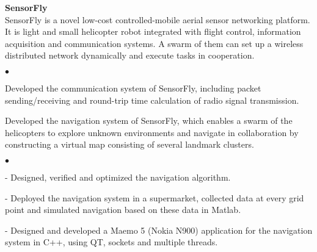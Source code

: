\documentclass[margin,line]{res}
\newenvironment{list1}{
  \begin{list}{\ding{113}}{
      \setlength{\itemsep}{0in}
      \setlength{\parsep}{0in} \setlength{\parskip}{0in}
      \setlength{\topsep}{0in} \setlength{\partopsep}{0in}
      \setlength{\leftmargin}{0.17in}}}{\end{list}}
\newenvironment{list2}{
  \begin{list}{$\bullet$}{
      \setlength{\itemsep}{0in}
      \setlength{\parsep}{0in} \setlength{\parskip}{0in}
      \setlength{\topsep}{0in} \setlength{\partopsep}{0in}
      \setlength{\leftmargin}{0.2in}}}{\end{list}}
\begin{document}
\begin{resume}
\begin{list1}
        \vspace*{.1in}
        \item[] {\bf SensorFly}\\
        SensorFly is a novel low-cost controlled-mobile aerial sensor networking platform. It is light and small helicopter robot integrated with flight control, information acquisition and communication systems. A swarm of them can set up a wireless distributed network dynamically and execute tasks in cooperation.%
        \vspace*{.05in}
        \begin{list2}
          \item Developed the communication system of SensorFly, including packet sending/receiving and round-trip time calculation of radio signal transmission.
          \item Developed the navigation system of SensorFly, which enables a swarm of the helicopters to explore unknown environments and navigate in collaboration by constructing a virtual map consisting of several landmark clusters.%
          \begin{list2}
            \item[-] Designed, verified and optimized the navigation algorithm.
            \item[-] Deployed the navigation system in a supermarket, collected data at every grid point and simulated navigation based on these data in Matlab.
            \item[-] Designed and developed a Maemo 5 (Nokia N900) application for the navigation system in C++, using QT, sockets and multiple threads.
          \end{list2}
        \end{list2}


\end{list1}
\end{resume}
\end{document}
